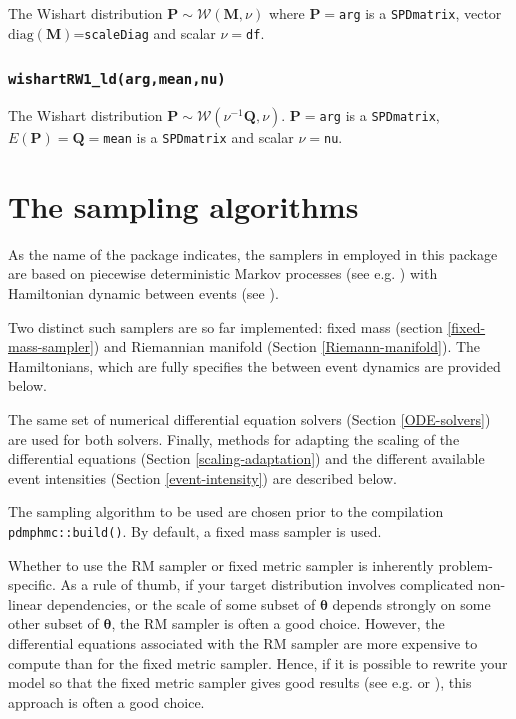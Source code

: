 \documentclass[
]{book}
\begin{document}
The Wishart distribution \(\mathbf P \sim \mathcal W(\mathbf M,\nu)\) where \(\mathbf P=\)\texttt{arg} is a \texttt{SPDmatrix}, vector \(\text{diag}(\mathbf M)\)=\texttt{scaleDiag} and scalar \(\nu=\)\texttt{df}.

\hypertarget{wishartrw1_ldargmeannu}{%
\subsection{\texorpdfstring{\texttt{wishartRW1\_ld(arg,mean,nu)}}{wishartRW1\_ld(arg,mean,nu)}}\label{wishartrw1_ldargmeannu}}

The Wishart distribution \(\mathbf P \sim \mathcal W(\nu^{-1}\mathbf Q,\nu)\). \(\mathbf P=\)\texttt{arg} is a \texttt{SPDmatrix}, \(E(\mathbf P)=\mathbf Q=\)\texttt{mean} is a \texttt{SPDmatrix} and scalar \(\nu=\)\texttt{nu}.

\hypertarget{the-samplers}{%
\chapter{The sampling algorithms}\label{the-samplers}}

As the name of the package indicates, the samplers in employed in this package are based on piecewise deterministic Markov processes (see e.g. \citet{fearnhead2018}) with Hamiltonian dynamic between events (see \citet{kleppe_CTHMC}).

Two distinct such samplers are so far implemented: fixed mass (section \ref{fixed-mass-sampler}) and Riemannian manifold (Section \ref{Riemann-manifold}). The Hamiltonians, which are fully specifies the between event dynamics are provided below.

The same set of numerical differential equation solvers (Section \ref{ODE-solvers}) are used for both solvers. Finally, methods for adapting the scaling of the differential equations (Section \ref{scaling-adaptation}) and the different available event intensities (Section \ref{event-intensity}) are described below.

The sampling algorithm to be used are chosen prior to the compilation \texttt{pdmphmc::build()}. By default, a fixed mass sampler is used.

Whether to use the RM sampler or fixed metric sampler is inherently problem-specific. As a rule of thumb, if your target distribution involves complicated non-linear dependencies, or the scale of some subset of \(\boldsymbol \theta\) depends strongly on some other subset of \(\boldsymbol \theta\), the RM sampler is often a good choice. However, the differential equations associated with the RM sampler are more expensive to compute than for the fixed metric sampler. Hence, if it is possible to rewrite your model so that the fixed metric sampler gives good results (see e.g. \citet{doi:10.1080/10618600.2019.1584901} or \citet{1812.07929}), this approach is often a good choice.
\end{document}
